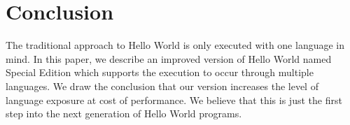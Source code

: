 \documentclass[11pt]{article}
\begin{document}
\section{Conclusion}
The traditional approach to Hello World is only executed with one language in mind. In this paper, we describe an improved version of Hello World named Special Edition which supports the execution to occur through multiple languages. We draw the conclusion that our version increases the level of language exposure at cost of performance. We believe that this is just the first step into the next generation of Hello World programs.





\end{document}
